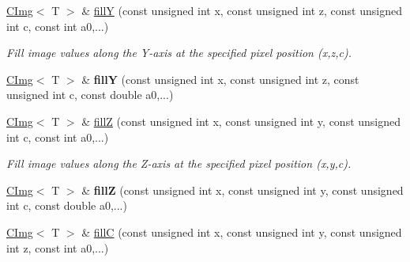 \begin{DoxyCompactItemize}
\item 
\hypertarget{structcimg__library_1_1CImg_a5188c20ba9f8fdb19714fb9ab1c683da}{
\hyperlink{structcimg__library_1_1CImg}{CImg}$<$ T $>$ \& \hyperlink{structcimg__library_1_1CImg_a5188c20ba9f8fdb19714fb9ab1c683da}{fillY} (const unsigned int x, const unsigned int z, const unsigned int c, const int a0,...)}
\label{structcimg__library_1_1CImg_a5188c20ba9f8fdb19714fb9ab1c683da}

\begin{DoxyCompactList}\small\item\em Fill image values along the Y-\/axis at the specified pixel position (x,z,c). \item\end{DoxyCompactList}\item 
\hypertarget{structcimg__library_1_1CImg_a930f2c6d651897883cde505139eb1fed}{
\hyperlink{structcimg__library_1_1CImg}{CImg}$<$ T $>$ \& {\bfseries fillY} (const unsigned int x, const unsigned int z, const unsigned int c, const double a0,...)}
\label{structcimg__library_1_1CImg_a930f2c6d651897883cde505139eb1fed}

\item 
\hypertarget{structcimg__library_1_1CImg_a459c6f75f00c3b57aa3b890f58293c32}{
\hyperlink{structcimg__library_1_1CImg}{CImg}$<$ T $>$ \& \hyperlink{structcimg__library_1_1CImg_a459c6f75f00c3b57aa3b890f58293c32}{fillZ} (const unsigned int x, const unsigned int y, const unsigned int c, const int a0,...)}
\label{structcimg__library_1_1CImg_a459c6f75f00c3b57aa3b890f58293c32}

\begin{DoxyCompactList}\small\item\em Fill image values along the Z-\/axis at the specified pixel position (x,y,c). \item\end{DoxyCompactList}\item 
\hypertarget{structcimg__library_1_1CImg_a15406648ed7ab11daf1b31c0f792ed9e}{
\hyperlink{structcimg__library_1_1CImg}{CImg}$<$ T $>$ \& {\bfseries fillZ} (const unsigned int x, const unsigned int y, const unsigned int c, const double a0,...)}
\label{structcimg__library_1_1CImg_a15406648ed7ab11daf1b31c0f792ed9e}

\item 
\hypertarget{structcimg__library_1_1CImg_a5fa9aa2659b9a4e08eb35ee32a948ee0}{
\hyperlink{structcimg__library_1_1CImg}{CImg}$<$ T $>$ \& \hyperlink{structcimg__library_1_1CImg_a5fa9aa2659b9a4e08eb35ee32a948ee0}{fillC} (const unsigned int x, const unsigned int y, const unsigned int z, const int a0,...)}
\label{structcimg__library_1_1CImg_a5fa9aa2659b9a4e08eb35ee32a948ee0}


\end{DoxyCompactItemize}
